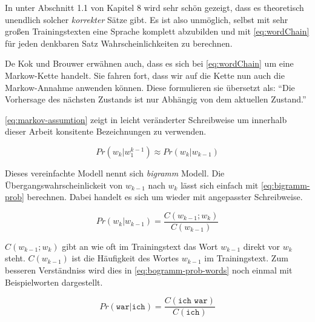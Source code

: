     In \parencite{nltk:book} unter Abschnitt 1.1 von Kapitel 8 wird sehr schön gezeigt, dass es theoretisch unendlich solcher \emph{korrekter} Sätze gibt. Es ist also unmöglich, selbst mit sehr großen Trainingstexten eine Sprache komplett abzubilden und mit \autoref{eq:wordChain} für jeden denkbaren Satz Wahrscheinlichkeiten zu berechnen.
    \newpage
        
    De Kok und Brouwer erwähnen auch, dass es sich bei \autoref{eq:wordChain} um eine Markow-Kette handelt. Sie fahren fort, dass wir auf die Kette nun auch die Markow-Annahme anwenden können. Diese formulieren sie übersetzt als: \enquote{Die Vorhersage des nächsten Zustands ist nur Abhängig von dem aktuellen Zustand.}\parencite[Abs.  3.8]{nlwp:book}
        
    \autoref{eq:markov-assumtion} zeigt \parencite[Abs.  3.8, Gleichung 3.8]{nlwp:book} in leicht veränderter Schreibweise um innerhalb dieser Arbeit konsitente Bezeichnungen zu verwenden.
        
    \begin{equation}
       	Pr(w_k|w_1^{k-1}) \approx Pr(w_k|w_{k-1})
       	\label{eq:markov-assumtion}
    \end{equation}
        
    Dieses vereinfachte Modell nennt sich \emph{bigramm} Modell. Die Übergangswahrscheinlickeit von \(w_{k-1}\) nach \(w_k\) lässt sich einfach mit \autoref{eq:bigramm-prob} berechnen. Dabei handelt es sich um \parencite[Abs.  3.8, Gleichung 3.9]{nlwp:book} wieder mit angepasster Schreibweise.
        
    \begin{equation}
       	Pr(w_k|w_{k-1}) = \frac{C(w_{k-1};w_k)}{C(w_{k-1})}
       	\label{eq:bigramm-prob}
    \end{equation}
    	
    \(C(w_{k-1};w_k)\) gibt an wie oft im Trainingstext das Wort \(w_{k-1}\) direkt vor \(w_k\) steht. \(C(w_{k-1})\) ist die Häufigkeit des Wortes \(w_{k-1}\) im Trainingstext. Zum besseren Verständniss wird dies in \autoref{eq:bogramm-prob-words} noch einmal mit Beispielworten dargestellt.
        
    \begin{equation}
       	Pr(\texttt{war}|\texttt{ich}) = \frac{C(\texttt{ich war})}{C(\texttt{ich})}
       	\label{eq:bogramm-prob-words}
    \end{equation}
        
